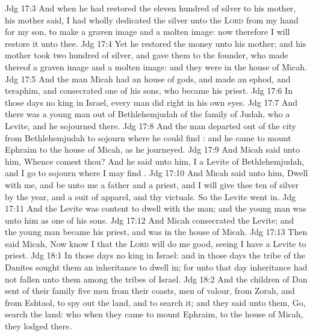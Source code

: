 \vs Jdg 17:3 And when he had restored the eleven hundred  of silver to his mother, his mother said, I had wholly dedicated the silver unto the \textsc{Lord} from my hand for my son, to make a graven image and a molten image: now therefore I will restore it unto thee.
\vs Jdg 17:4 Yet he restored the money unto his mother; and his mother took two hundred  of silver, and gave them to the founder, who made thereof a graven image and a molten image: and they were in the house of Micah.
\vs Jdg 17:5 And the man Micah had an house of gods, and made an ephod, and teraphim, and consecrated one of his sons, who became his priest.
\vs Jdg 17:6 In those days  no king in Israel,  every man did  right in his own eyes.
\vs Jdg 17:7 And there was a young man out of Bethlehemjudah of the family of Judah, who  a Levite, and he sojourned there.
\vs Jdg 17:8 And the man departed out of the city from Bethlehemjudah to sojourn where he could find : and he came to mount Ephraim to the house of Micah, as he journeyed.
\vs Jdg 17:9 And Micah said unto him, Whence comest thou? And he said unto him, I  a Levite of Bethlehemjudah, and I go to sojourn where I may find .
\vs Jdg 17:10 And Micah said unto him, Dwell with me, and be unto me a father and a priest, and I will give thee ten  of silver by the year, and a suit of apparel, and thy victuals. So the Levite went in.
\vs Jdg 17:11 And the Levite was content to dwell with the man; and the young man was unto him as one of his sons.
\vs Jdg 17:12 And Micah consecrated the Levite; and the young man became his priest, and was in the house of Micah.
\vs Jdg 17:13 Then said Micah, Now know I that the \textsc{Lord} will do me good, seeing I have a Levite to  priest.
\vs Jdg 18:1 In those days  no king in Israel: and in those days the tribe of the Danites sought them an inheritance to dwell in; for unto that day  inheritance had not fallen unto them among the tribes of Israel.
\vs Jdg 18:2 And the children of Dan sent of their family five men from their coasts, men of valour, from Zorah, and from Eshtaol, to spy out the land, and to search it; and they said unto them, Go, search the land: who when they came to mount Ephraim, to the house of Micah, they lodged there.
